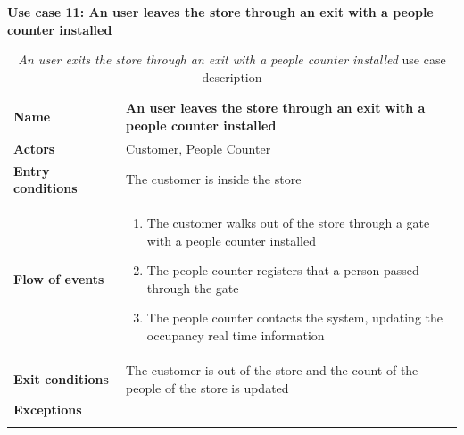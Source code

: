 \clearpage
\textbf{Use case 11: An user leaves the store through an exit with a people counter installed}
\smallskip
{}
\begin{longtable}{p{0.25\linewidth}p{0.75\linewidth}}
    \toprule
    \textbf{Name}             & \textbf{An user leaves the store through an exit with a people counter installed}    \\
    \midrule
    \textbf{Actors}           & Customer, People Counter                                                             \\
    \midrule
    \textbf{Entry conditions} & The customer is inside the store                                                     \\
    \midrule
    \textbf{Flow of events}   &
    \begin{enumerate}
        \item The customer walks out of the store through a gate with a people counter installed
        \item The people counter registers that a person passed through the gate
        \item The people counter contacts the system, updating the occupancy real time information
    \end{enumerate}                                                                                       \\
    \midrule
    \textbf{Exit conditions}  & The customer is out of the store and the count of the people of the store is updated \\
    \midrule
    \textbf{Exceptions}       &                                                                                      \\
    \bottomrule
    \caption{\emph{An user exits the store through an exit with a people counter installed} use case description}
\end{longtable}

